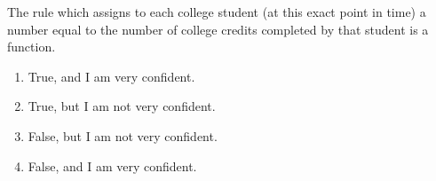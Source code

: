 \bigskip

\item The rule which assigns to each college student (at this exact point in time) a number equal to the number of college credits completed by that student is a function.

\begin{enumerate}
\item True, and I am very confident.
\item True, but I am not very confident.
\item False, but I am not very confident.
\item False, and I am very confident.
\end{enumerate}

